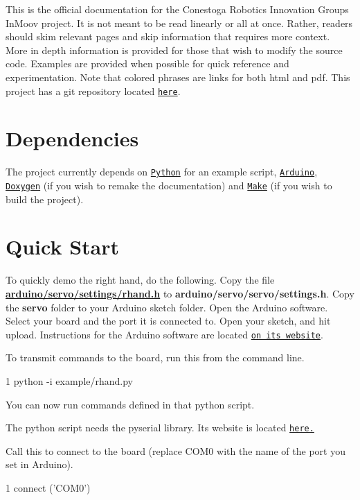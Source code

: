This is the official documentation for the Conestoga Robotics Innovation Group\textquotesingle{}s In\+Moov project. It is not meant to be read linearly or all at once. Rather, readers should skim relevant pages and skip information that requires more context. More in depth information is provided for those that wish to modify the source code. Examples are provided when possible for quick reference and experimentation. Note that colored phrases are links for both html and pdf. This project has a git repository located \href{https://github.com/rbong/rig-inmoov}{\tt here}.\hypertarget{index_Dependencies}{}\section{Dependencies}\label{index_Dependencies}
The project currently depends on \href{http://www.python.org}{\tt Python} for an example script, \href{http://www.arduino.cc}{\tt Arduino}, \href{http://www.stack.nl/~dimitri/doxygen/}{\tt Doxygen} (if you wish to remake the documentation) and \href{http://www.gnu.org/software/make/}{\tt Make} (if you wish to build the project).\hypertarget{index_Quick_Start}{}\section{Quick Start}\label{index_Quick_Start}
To quickly demo the right hand, do the following. Copy the file {\bfseries \hyperlink{rhand_8h}{arduino/servo/settings/rhand.\+h}} to {\bfseries arduino/servo/servo/settings.\+h}. Copy the {\bfseries servo} folder to your Arduino sketch folder. Open the Arduino software. Select your board and the port it is connected to. Open your sketch, and hit upload. Instructions for the Arduino software are located \href{http://www.arduino.cc}{\tt on its website}.

To transmit commands to the board, run this from the command line. 
\begin{DoxyCode}
1 python -i example/rhand.py
\end{DoxyCode}
 You can now run commands defined in that python script.

The python script needs the pyserial library. Its website is located \href{http://pyserial.sourceforge.net/}{\tt here.}

Call this to connect to the board (replace C\+O\+M0 with the name of the port you set in Arduino). 
\begin{DoxyCode}
1 connect (\textcolor{stringliteral}{'COM0'})
\end{DoxyCode}


